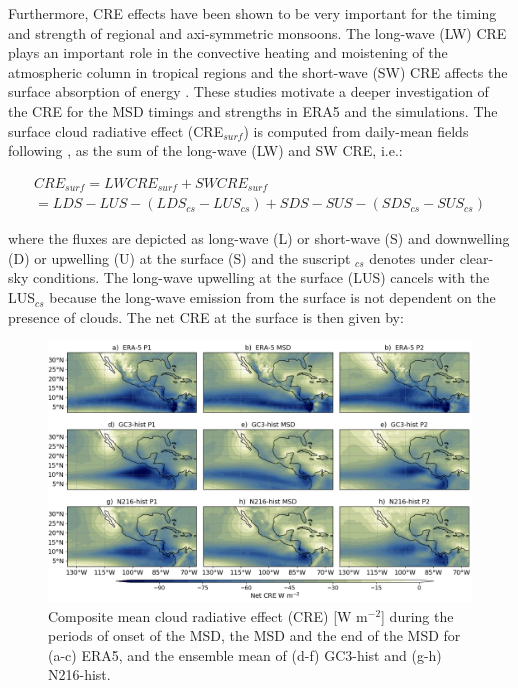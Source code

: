 Furthermore,  CRE effects have been shown to be very important for the timing and strength of regional \citep{guo2015} and axi-symmetric \citep{byrne2020} monsoons. The long-wave (LW) CRE plays an important role in the convective heating and moistening of the atmospheric column in tropical regions and the short-wave (SW) CRE affects the surface absorption of energy \citep{allan2011}. 
These studies motivate a deeper investigation of the CRE for the MSD timings and strengths in ERA5 and the simulations. The surface cloud radiative effect (CRE$_{surf}$) is computed from daily-mean fields following \cite{allan2011}, as the sum of the long-wave (LW) and SW CRE, i.e.:

\begin{multline}
CRE_{surf}=LW CRE_{surf} +SW CRE_{surf} \\ = LDS-LUS -(LDS_{cs}-LUS_{cs})+SDS-SUS-(SDS_{cs}-SUS_{cs})
\end{multline}

where the fluxes are depicted as long-wave (L) or short-wave (S) and downwelling (D) or upwelling (U) at the surface (S) and the suscript $_{cs}$ denotes under clear-sky conditions. The long-wave upwelling at the surface (LUS) cancels with the LUS$_{cs}$ because the long-wave emission from the surface is not dependent on the presence of clouds. The net CRE at the surface is then given by:

\begin{figure}[b!]
\includegraphics[width=\linewidth]{figures/fig4_creclim_3.png}
\caption{Composite mean cloud radiative effect (CRE) [W m$^{-2}$] during the periods of onset of the MSD, the MSD and the end of the MSD for (a-c) ERA5, and the ensemble mean of (d-f) GC3-hist and (g-h) N216-hist.}
\label{fig:cre_comp}
\end{figure}

